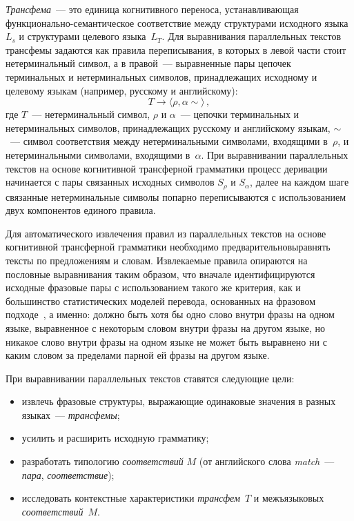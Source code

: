 \begin{multicols}{2}
   \textit{Трансфема}~--- это единица когнитивного переноса, устанавливающая
функционально-се\-ман\-ти\-че\-ское соответствие между структурами исходного языка
$L_s$ и структурами целевого языка~$L_T$. Для выравнивания параллельных
текстов трансфемы задаются как правила переписывания, в которых в левой части
стоит нетерминальный символ, а в правой~--- выравненные пары цепочек
терминальных и нетерминальных символов, принадлежащих исходному и
целевому языкам (например, русскому и английскому):
   \begin{equation*}
   T\rightarrow \langle \rho,\alpha \sim \rangle\,,
   \end{equation*}
     где $T$~--- нетерминальный символ, $\rho$ и $\alpha$~--- цепочки
терминальных и нетерминальных символов, принадлежащих русскому и
английскому языкам, $\sim$~--- символ соответствия между нетерминальными
символами, входящими в~$\rho$, и нетерминальными символами, входящими
в~$\alpha$. При выравнивании параллельных текстов на основе когнитивной
трансферной грамматики процесс деривации начинается с пары связанных
исходных символов $S_\rho$ и $S_\alpha$, далее на каждом шаге связанные
нетерминальные символы попарно переписываются с использованием двух
компонентов единого правила.

     Для автоматического извлечения правил из параллельных текстов на основе
когнитивной трансферной грамматики необходимо предварительно\linebreak выравнять
тексты по предложениям и словам. Извлека\-емые правила опираются на пословные
выравнивания таким образом, что вначале идентифицируются исходные фразовые
пары с использованием такого же критерия, как и большинство статистических
моделей перевода, основанных на фразовом подходе~\cite{14-koz}, а именно:
должно быть хотя бы одно слово внутри фразы на одном языке, выравненное с
некоторым словом внутри фразы на другом языке, но никакое слово внутри фразы
на одном языке не может быть выравнено ни с каким словом за пределами парной
ей фразы на другом языке.

   При выравнивании параллельных текстов ставятся следующие цели:
   \begin{itemize}
\item извлечь фразовые структуры, выражающие одинаковые значения в разных
языках~--- \textit{трансфемы};
\item усилить и расширить исходную грамматику;
\item разработать типологию \textit{соответствий} $M$ (от английского слова
\textit{match}~--- \textit{пара}, \textit{соответствие});
\item исследовать контекстные характеристики \textit{трансфем}~$T$ и
межъязыковых \textit{соответствий}~$M$.
\end{itemize}


\end{multicols}
